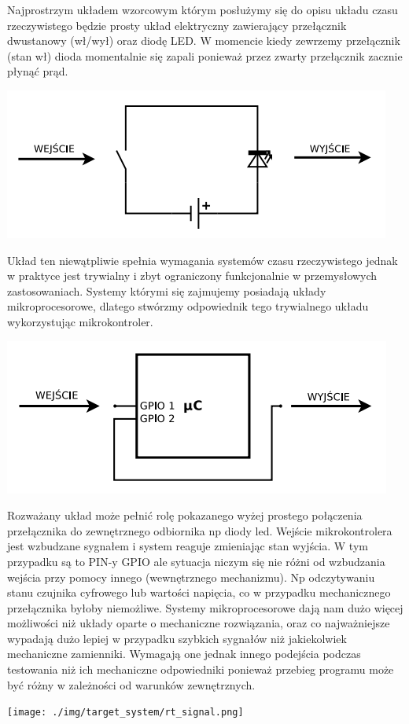 \par 
\tab Najprostrzym układem wzorcowym którym posłużymy się do opisu układu czasu rzeczywistego będzie prosty układ elektryczny zawierający przełącznik dwustanowy (wł/wył) oraz diodę LED. W momencie kiedy zewrzemy przełącznik (stan wł) dioda momentalnie się zapali ponieważ przez zwarty przełącznik zacznie płynąć prąd. 

 \centerline{\includegraphics[scale=0.50]{./img/target_system/RT_wzorzec_led.png}}
Układ ten niewątpliwie spełnia wymagania systemów czasu rzeczywistego jednak w praktyce jest trywialny i zbyt ograniczony funkcjonalnie w przemysłowych zastosowaniach. Systemy którymi się zajmujemy posiadają układy mikroprocesorowe, dlatego stwórzmy odpowiednik tego trywialnego układu wykorzystując mikrokontroler.

 \centerline{\includegraphics[scale=0.50]{./img/target_system/uc_RT_gpio.png}}
 
 Rozważany układ może pełnić rolę pokazanego wyżej prostego połączenia przełącznika do zewnętrznego odbiornika np diody led. Wejście mikrokontrolera jest wzbudzane sygnałem i system reaguje zmieniając stan wyjścia. W tym przypadku są to PIN-y GPIO ale sytuacja niczym się nie różni od wzbudzania wejścia przy pomocy innego (wewnętrznego mechanizmu). Np odczytywaniu stanu czujnika cyfrowego lub wartości napięcia, co w przypadku mechanicznego przełącznika byłoby niemożliwe. Systemy mikroprocesorowe dają nam dużo więcej możliwości niż układy oparte o mechaniczne rozwiązania, oraz co najważniejsze wypadają dużo lepiej w przypadku szybkich sygnałów niż jakiekolwiek mechaniczne zamienniki. Wymagają one jednak innego podejścia podczas testowania niż ich mechaniczne odpowiedniki ponieważ przebieg programu może być różny w zależności od warunków zewnętrznych. \\
 \centerline{\texttt{[image: ./img/target\_system/rt\_signal.png]}}


